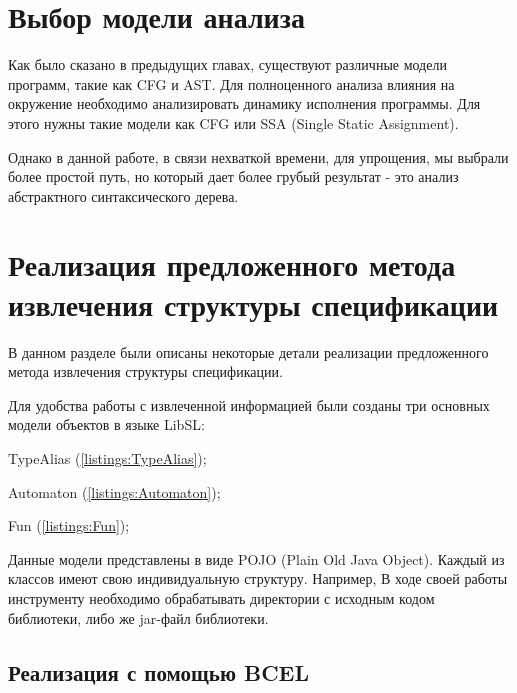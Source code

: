 \section{Выбор модели анализа}

Как было сказано в предыдущих главах, существуют различные модели программ, такие как CFG и AST.
Для полноценного анализа влияния на окружение необходимо анализировать динамику исполнения программы.
Для этого нужны такие модели как CFG или SSA (Single Static Assignment).

Однако в данной работе, в связи нехваткой времени, для упрощения, мы выбрали более простой путь, но который дает более грубый результат - это анализ абстрактного синтаксического дерева.


\section{Реализация предложенного метода извлечения структуры спецификации}

В данном разделе были описаны некоторые детали реализации предложенного метода извлечения структуры спецификации.

Для удобства работы с извлеченной информацией были созданы три основных модели объектов в языке LibSL:
%
\begin{itemize*}
\item TypeAlias (\ref{listings:TypeAlias});
\item Automaton (\ref{listings:Automaton});
\item Fun (\ref{listings:Fun});
\end{itemize*}
%

Данные модели представлены в виде POJO (Plain Old Java Object). Каждый из классов имеют свою индивидуальную структуру. Например,
В ходе своей работы инструменту необходимо обрабатывать директории с исходным кодом библиотеки, либо же jar-файл библиотеки.

\subsection{Реализация с помощью BCEL}

